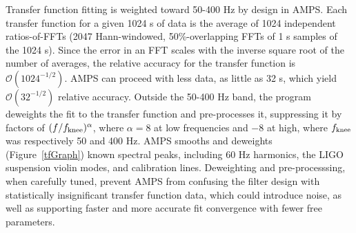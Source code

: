 Transfer function fitting is weighted toward 50-400 Hz by design in AMPS. Each transfer function for a given 1024 s of data is the average of 1024 independent ratios-of-FFTs (2047 Hann-windowed, 50\%-overlapping FFTs of 1 s samples of the 1024 s). Since the error in an FFT scales with the inverse square root of the number of averages, the relative accuracy for the transfer function is $\mathcal{O}\left(1024^{-1/2}\right)$. AMPS can proceed with less data, as little as 32 s, which yield $\mathcal{O}\left(32^{-1/2}\right)$ relative accuracy. Outside the 50-400 Hz band, the program deweights the fit to the transfer function and pre-processes it, suppressing it by factors of $(f/f_\textup{knee})^\alpha$, where $\alpha = 8$ at low frequencies and $-8$ at high, where $f_\textup{knee}$ was respectively 50 and 400 Hz. AMPS smooths and deweights (Figure~\ref{tfGraph}) known spectral peaks, including 60 Hz harmonics, the LIGO suspension violin modes, and calibration lines. Deweighting and pre-processsing, when carefully tuned, prevent AMPS from confusing the filter design with statistically insignificant transfer function data, which could introduce noise, as well as supporting faster and more accurate fit convergence with fewer free parameters.


 



